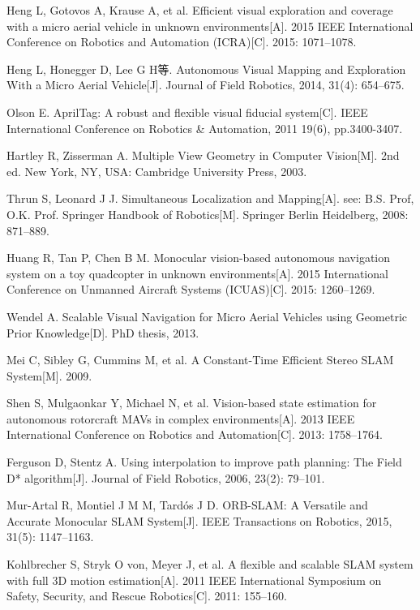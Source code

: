\begin{thebibliography}{00}
     Heng L, Gotovos A, Krause A, et al. Efficient visual exploration and coverage with a micro aerial vehicle in unknown environments[A]. 2015 IEEE International Conference on Robotics and Automation (ICRA)[C]. 2015: 1071–1078.

     Heng L, Honegger D, Lee G H等. Autonomous Visual Mapping and Exploration With a Micro Aerial Vehicle[J]. Journal of Field Robotics, 2014, 31(4): 654–675.

     Olson E. AprilTag: A robust and flexible visual fiducial system[C]. IEEE International Conference on Robotics \& Automation, 2011 19(6), pp.3400-3407.

     Hartley R, Zisserman A. Multiple View Geometry in Computer Vision[M]. 2nd ed. New York, NY, USA: Cambridge University Press, 2003.

     Thrun S, Leonard J J. Simultaneous Localization and Mapping[A]. see: B.S. Prof, O.K. Prof. Springer Handbook of Robotics[M]. Springer Berlin Heidelberg, 2008: 871–889.

     Huang R, Tan P, Chen B M. Monocular vision-based autonomous navigation system on a toy quadcopter in unknown environments[A]. 2015 International Conference on Unmanned Aircraft Systems (ICUAS)[C]. 2015: 1260–1269.

     Wendel A. Scalable Visual Navigation for Micro Aerial Vehicles using Geometric Prior Knowledge[D]. PhD thesis, 2013.

     Mei C, Sibley G, Cummins M, et al. A Constant-Time Efficient Stereo SLAM System[M]. 2009.

     Shen S, Mulgaonkar Y, Michael N, et al. Vision-based state estimation for autonomous rotorcraft MAVs in complex environments[A]. 2013 IEEE International Conference on Robotics and Automation[C]. 2013: 1758–1764.

     Ferguson D, Stentz A. Using interpolation to improve path planning: The Field D* algorithm[J]. Journal of Field Robotics, 2006, 23(2): 79–101.

     Mur-Artal R, Montiel J M M, Tardós J D. ORB-SLAM: A Versatile and Accurate Monocular SLAM System[J]. IEEE Transactions on Robotics, 2015, 31(5): 1147–1163.

     Kohlbrecher S, Stryk O von, Meyer J, et al. A flexible and scalable SLAM system with full 3D motion estimation[A]. 2011 IEEE International Symposium on Safety, Security, and Rescue Robotics[C]. 2011: 155–160.


\end{thebibliography}
